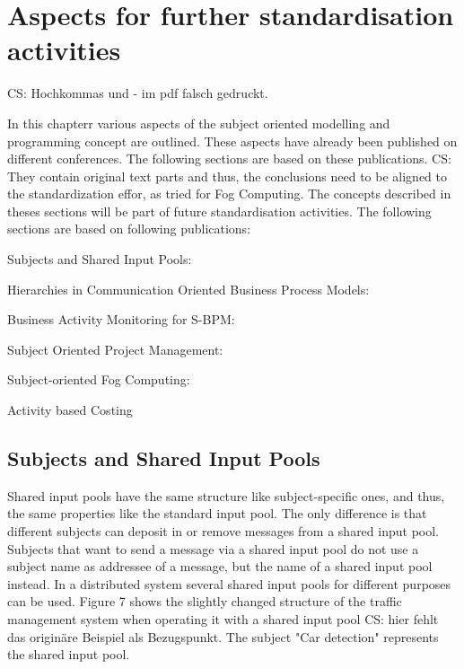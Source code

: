 
\chapter{Aspects for further standardisation activities}

CS: Hochkommas und - im pdf falsch gedruckt.

In this chapterr various aspects of the subject oriented modelling and programming concept are outlined. These aspects have already been published on different conferences. The following sections are based on these publications. CS: They contain original text parts and thus, the conclusions need to be aligned to the standardization effor, as tried for Fog Computing.
The concepts described in theses sections will be part of future standardisation activities.
The following sections are based on following publications:\\
\begin{list}{-}
	\item Subjects and Shared Input Pools:
	\item Hierarchies in Communication Oriented Business Process Models:
	\item Business Activity Monitoring for S-BPM: \cite{article:SubProcessMon}
	\item Subject Oriented Project Management:
	\item Subject-oriented Fog Computing: \cite{article:FogComp}
	\item Activity based Costing \cite{article:SBPMCosting}
\end{list}

\section{Subjects and Shared Input Pools}

Shared input pools have the same structure like subject-specific ones, and thus, the same properties like the standard input pool. The only difference is that different subjects can deposit in or remove messages from a shared input pool. Subjects that want to send a message via a shared input pool do not use a subject name as addressee of a message, but the name of a shared input pool instead. In a distributed system several shared input pools for different purposes can be used. Figure 7 shows the slightly changed structure of the traffic management system when operating it with a shared input pool CS: hier fehlt das originäre Beispiel als Bezugspunkt. The subject "Car detection" represents the shared input pool.



